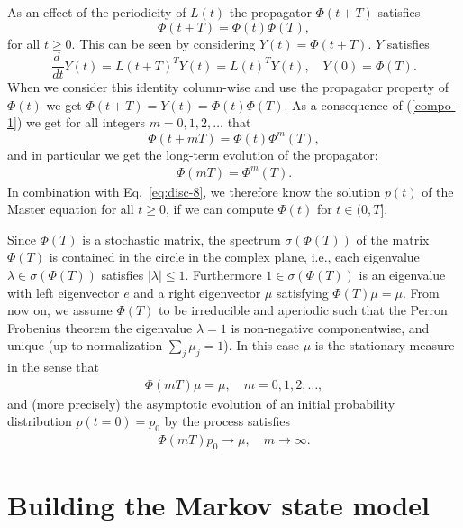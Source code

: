 \documentclass[aps, pre, preprint,unsortedaddress,a4paper,onecolumn]{revtex4}
\newcommand{\vect}[1]{#1}
\newcommand{\myphi}{\Phi}
\newcommand{\mymu}{\mu}
\begin{document}
As an effect of the periodicity of $\vect L(t)$ the propagator $\myphi(t+T)$
satisfies
\begin{equation}\label{compo-1}
\myphi(t+T)=\myphi(t)\myphi(T),
\end{equation}
for all $t\ge 0$. This can be seen by considering $\vect Y(t)=\myphi(t+T)$. $\vect Y$ satisfies
\[
\frac{d\ }{dt}\vect Y(t)=\vect L(t+T)^T \vect Y(t)=\vect L(t)^T\vect Y(t),\quad \vect Y(0)=\myphi(T).
\]
When we consider this identity column-wise and use the propagator property of $\myphi(t)$ we get $\myphi(t+T)=\vect Y(t)=\myphi(t)\myphi(T)$. As a consequence of (\ref{compo-1}) we get for all integers $m=0,1,2,\ldots$ that 
\begin{equation}\label{compo-2}
\myphi(t+mT)=\myphi(t)\myphi^m(T),
\end{equation}
and in particular we get the long-term evolution of the propagator:
\begin{align}
\label{eq:floq-13}  
\myphi(mT)=\myphi^m(T).
\end{align}
In combination with Eq.~\eqref{eq:disc-8}, we therefore
know the solution $\vect p(t)$ of the Master equation for all $t\ge 0$,
if we can compute $\myphi(t)$ for $t\in (0,T]$.  

Since $\myphi(T)$ is a stochastic matrix, the spectrum $\sigma(\myphi(T))$
of the matrix $\myphi(T)$ is contained in the circle in
the complex plane, i.e., each eigenvalue $\lambda\in \sigma(\myphi(T))$
satisfies $|\lambda|\le 1$. Furthermore $1\in\sigma(\myphi(T))$ is an
eigenvalue with left eigenvector $\vect e$ and a right eigenvector $\mymu$
satisfying
$\myphi(T)\mymu=\mymu$.
From now on, we assume $\myphi(T)$ to be irreducible and aperiodic such that the Perron Frobenius theorem the eigenvalue $\lambda=1$ is  non-negative componentwise, and unique (up to normalization $\sum_j\mu_j=1$). In this case $\mymu$ is the stationary measure in the sense that
\begin{align}
\label{eq:floq-14}  
\myphi(mT) \mymu = \mymu,\quad m=0,1,2,\ldots,
\end{align}
and (more precisely) the asymptotic evolution of an initial probability distribution $\vect p(t=0)=\vect p_0$ by the process satisfies
\begin{align}
\label{eq:floq-15}  
\myphi(mT)\vect p_0\to \mymu,\quad m\to\infty.
\end{align}


\section{Building the Markov state model}
\label{sec:build-msm}
\end{document}
